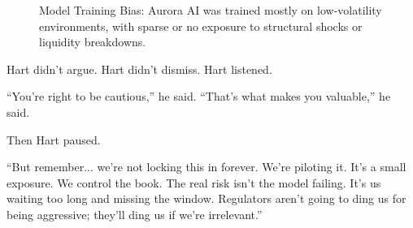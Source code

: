 \medskip

\begin{figure}[H]
  \centering
  \caption{Model Training Bias: Aurora AI was trained mostly on low-volatility environments, with sparse or no exposure to structural shocks or liquidity breakdowns.}
\end{figure}
 
\medskip

Hart didn’t argue. Hart didn’t dismiss.  Hart listened.

``You’re right to be cautious,'' he said.  
``That’s what makes you valuable,'' he said.

Then Hart paused.

``But remember... we’re not locking this in forever. We’re piloting it. It's a small exposure. We control the book. The real 
risk isn’t the model failing. It’s us waiting too long and missing the window. Regulators aren’t going to ding us for being 
aggressive; they’ll ding us if we’re irrelevant.''

